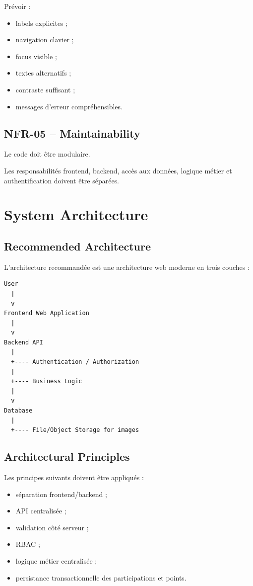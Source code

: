 \documentclass[11pt,a4paper]{report}
\begin{document}
Prévoir :

\begin{itemize}
    \item labels explicites ;
    \item navigation clavier ;
    \item focus visible ;
    \item textes alternatifs ;
    \item contraste suffisant ;
    \item messages d'erreur compréhensibles.
\end{itemize}

\section{NFR-05 -- Maintainability}

Le code doit être modulaire.

Les responsabilités frontend, backend, accès aux données, logique métier et authentification doivent être séparées.

\chapter{System Architecture}

\section{Recommended Architecture}

L'architecture recommandée est une architecture web moderne en trois couches :

\begin{verbatim}
User
  |
  v
Frontend Web Application
  |
  v
Backend API
  |
  +---- Authentication / Authorization
  |
  +---- Business Logic
  |
  v
Database
  |
  +---- File/Object Storage for images
\end{verbatim}

\section{Architectural Principles}

Les principes suivants doivent être appliqués :

\begin{itemize}
    \item séparation frontend/backend ;
    \item API centralisée ;
    \item validation côté serveur ;
    \item RBAC ;
    \item logique métier centralisée ;
    \item persistance transactionnelle des participations et points.
\end{itemize}
\end{document}
